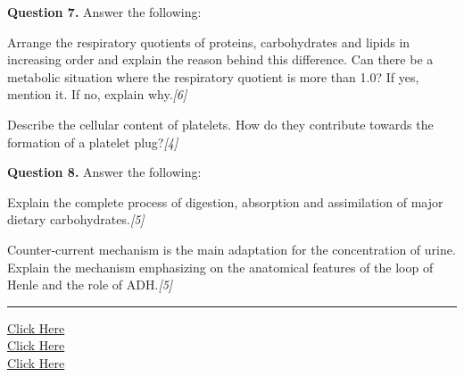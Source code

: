 \documentclass[11pt,a4paper]{article}
\newcommand{\pts}[1]{\hfill   \textit{[#1]}}
\begin{document}
\medskip


\noindent   \textbf{Question 7.} Answer the following:

\begin{parts}
  \item Arrange the respiratory quotients of proteins, carbohydrates and lipids in increasing order and explain the reason behind this difference. Can there be a metabolic situation where the respiratory quotient is more than 1.0? If yes, mention it. If no, explain why.\pts{6}
  \item Describe the cellular content of platelets. How do they contribute towards the formation of a platelet plug?\pts{4}
\end{parts}

\pagebreak

\medskip


\noindent   \textbf{Question 8.} Answer the following:

\begin{parts}
  \item Explain the complete process of digestion, absorption and assimilation of major dietary carbohydrates.\pts{5}
  \item Counter-current mechanism is the main adaptation for the concentration of urine. Explain the mechanism emphasizing on the anatomical features of the loop of Henle and the role of ADH.\pts{5}
\end{parts}

\vfill
\rule{\linewidth}{0.4pt}

\begin{center}\small
\href{https://bhu-exam.vercel.app/}{Click Here}\\[4pt]\href{https://me-aryan.vercel.app/}{Click Here}\\[4pt]\href{https://quashan-me.vercel.app/}{Click Here}
\end{center}
\end{document}
